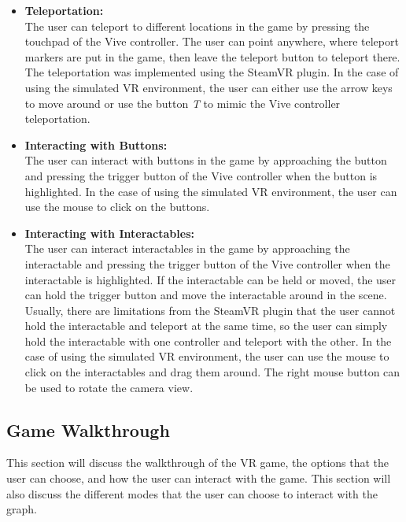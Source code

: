 \begin{itemize}
    \item \textbf{Teleportation:} \\
          The user can teleport to different locations in the game by pressing the touchpad of the Vive controller. The user can point anywhere, where teleport markers are put in the game, then leave the teleport button to teleport there. The teleportation was implemented using the SteamVR plugin. In the case of using the simulated \ac{VR} environment, the user can either use the arrow keys to move around or use the button \textit{T} to mimic the Vive controller teleportation.

    \item \textbf{Interacting with Buttons:} \\
          The user can interact with buttons in the game by approaching the button and pressing the trigger button of the Vive controller when the button is highlighted. In the case of using the simulated \ac{VR} environment, the user can use the mouse to click on the buttons.

    \item \textbf{Interacting with Interactables:} \\
          The user can interact interactables in the game by approaching the interactable and pressing the trigger button of the Vive controller when the interactable is highlighted. If the interactable can be held or moved, the user can hold the trigger button and move the interactable around in the scene. Usually, there are limitations from the SteamVR plugin that the user cannot hold the interactable and teleport at the same time, so the user can simply hold the interactable with one controller and teleport with the other. In the case of using the simulated \ac{VR} environment, the user can use the mouse to click on the interactables and drag them around. The right mouse button can be used to rotate the camera view.
\end{itemize}

\subsection{Game Walkthrough} \label{subsec:game_walkthrough}
This section will discuss the walkthrough of the \ac{VR} game, the options that the user can choose, and how the user can interact with the game. This section will also discuss the different modes that the user can choose to interact with the graph.

